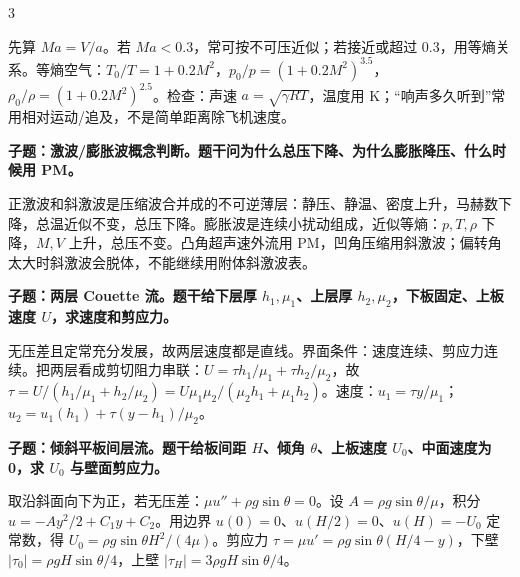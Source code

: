 \documentclass[a4paper]{article}
\newcommand{\qt}[1]{\vspace{0.10pt}\colorbox{Q}{\parbox{\dimexpr\linewidth-2\fboxsep}{\color{white}\bfseries #1}}\par}
\newcommand{\ans}[1]{\colorbox{G}{\parbox{\dimexpr\linewidth-2\fboxsep}{#1}}\par}
\begin{document}
\begin{multicols}{3}
\ans{先算 $Ma=V/a$。若 $Ma<0.3$，常可按不可压近似；若接近或超过 0.3，用等熵关系。等熵空气：$T_0/T=1+0.2M^2$，$p_0/p=(1+0.2M^2)^{3.5}$，$\rho_0/\rho=(1+0.2M^2)^{2.5}$。检查：声速 $a=\sqrt{\gamma RT}$，温度用 K；“响声多久听到”常用相对运动/追及，不是简单距离除飞机速度。}
\qt{子题：激波/膨胀波概念判断。题干问为什么总压下降、为什么膨胀降压、什么时候用 PM。}
\ans{正激波和斜激波是压缩波合并成的不可逆薄层：静压、静温、密度上升，马赫数下降，总温近似不变，总压下降。膨胀波是连续小扰动组成，近似等熵：$p,T,\rho$ 下降，$M,V$ 上升，总压不变。凸角超声速外流用 PM，凹角压缩用斜激波；偏转角太大时斜激波会脱体，不能继续用附体斜激波表。}
\qt{子题：两层 Couette 流。题干给下层厚 $h_1,\mu_1$、上层厚 $h_2,\mu_2$，下板固定、上板速度 $U$，求速度和剪应力。}
\ans{无压差且定常充分发展，故两层速度都是直线。界面条件：速度连续、剪应力连续。把两层看成剪切阻力串联：$U=\tau h_1/\mu_1+\tau h_2/\mu_2$，故 $\tau=U/(h_1/\mu_1+h_2/\mu_2)=U\mu_1\mu_2/(\mu_2h_1+\mu_1h_2)$。速度：$u_1=\tau y/\mu_1$；$u_2=u_1(h_1)+\tau(y-h_1)/\mu_2$。}
\qt{子题：倾斜平板间层流。题干给板间距 $H$、倾角 $\theta$、上板速度 $U_0$、中面速度为0，求 $U_0$ 与壁面剪应力。}
\ans{取沿斜面向下为正，若无压差：$\mu u''+\rho g\sin\theta=0$。设 $A=\rho g\sin\theta/\mu$，积分 $u=-Ay^2/2+C_1y+C_2$。用边界 $u(0)=0$、$u(H/2)=0$、$u(H)=-U_0$ 定常数，得 $U_0=\rho g\sin\theta H^2/(4\mu)$。剪应力 $\tau=\mu u'=\rho g\sin\theta(H/4-y)$，下壁 $|\tau_0|=\rho gH\sin\theta/4$，上壁 $|\tau_H|=3\rho gH\sin\theta/4$。}
\end{multicols}
\end{document}
